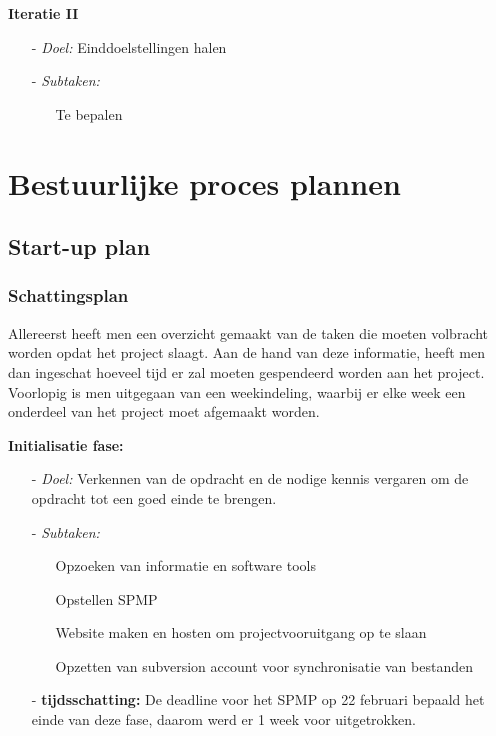 \documentclass{article}
\begin{document}
\textbf{\large Iteratie II}
\begin{itemize}
\item[-] \textit{Doel:} Einddoelstellingen halen\\[-5mm]
\item[-] \textit{Subtaken:}\\[-5mm]
\begin{itemize}
	\item[] Te bepalen \\[-5mm]
\end{itemize}
\end{itemize}


\newpage
\section{Bestuurlijke proces plannen}


\subsection{Start-up plan}

\subsubsection{Schattingsplan}

Allereerst heeft men een overzicht gemaakt van de taken die moeten volbracht worden opdat het project slaagt. Aan de hand van deze informatie, heeft men dan ingeschat hoeveel tijd er zal moeten gespendeerd worden aan het project. Voorlopig is men uitgegaan van een weekindeling, waarbij er elke week een onderdeel van het project moet afgemaakt worden. 

\textbf{Initialisatie fase:}
\begin{itemize}
\item[-] \textit{Doel:} Verkennen van de opdracht en de nodige kennis vergaren om de opdracht tot een goed einde te brengen. \\[-5mm]
\item[-] \textit{Subtaken:}\\[-5mm]
\begin{itemize}
	\item[] Opzoeken van informatie en software tools\\[-5mm]
	\item[] Opstellen SPMP\\[-5mm]
	\item[] Website maken en hosten om projectvooruitgang op te slaan\\[-5mm]
	\item[] Opzetten van subversion account voor synchronisatie van bestanden \\[-5mm]
\end{itemize}
\item[-] \textbf{tijdsschatting:} De deadline voor het SPMP op 22 februari bepaald het einde van deze fase, daarom werd er 1 week voor uitgetrokken.\\[-5mm]
\end{itemize}
\end{document}
